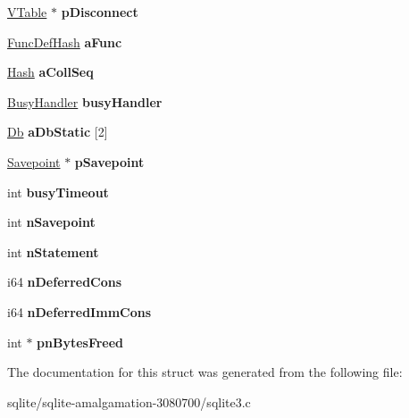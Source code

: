 \begin{DoxyCompactItemize}
\item 
\hypertarget{structsqlite3_a048405f503316fad7d7116fd930299db}{\hyperlink{struct_v_table}{V\+Table} $\ast$ {\bfseries p\+Disconnect}}\label{structsqlite3_a048405f503316fad7d7116fd930299db}

\item 
\hypertarget{structsqlite3_a1f1c623a26e916021fbb2fe6d84dcede}{\hyperlink{struct_func_def_hash}{Func\+Def\+Hash} {\bfseries a\+Func}}\label{structsqlite3_a1f1c623a26e916021fbb2fe6d84dcede}

\item 
\hypertarget{structsqlite3_a259afda236b21b947f6dc7e0b3e605c3}{\hyperlink{struct_hash}{Hash} {\bfseries a\+Coll\+Seq}}\label{structsqlite3_a259afda236b21b947f6dc7e0b3e605c3}

\item 
\hypertarget{structsqlite3_a5f50915803efe2ad40dc1a5e31763671}{\hyperlink{struct_busy_handler}{Busy\+Handler} {\bfseries busy\+Handler}}\label{structsqlite3_a5f50915803efe2ad40dc1a5e31763671}

\item 
\hypertarget{structsqlite3_ad99069213dff7fede71447b97d22d710}{\hyperlink{struct_db}{Db} {\bfseries a\+Db\+Static} \mbox{[}2\mbox{]}}\label{structsqlite3_ad99069213dff7fede71447b97d22d710}

\item 
\hypertarget{structsqlite3_a47f4fe21bba981ccd47ee7f873f48a07}{\hyperlink{struct_savepoint}{Savepoint} $\ast$ {\bfseries p\+Savepoint}}\label{structsqlite3_a47f4fe21bba981ccd47ee7f873f48a07}

\item 
\hypertarget{structsqlite3_a69237f7a2b079706c544f09255fd8905}{int {\bfseries busy\+Timeout}}\label{structsqlite3_a69237f7a2b079706c544f09255fd8905}

\item 
\hypertarget{structsqlite3_a51d1dc4f5668dbc2282162bdfdca96ec}{int {\bfseries n\+Savepoint}}\label{structsqlite3_a51d1dc4f5668dbc2282162bdfdca96ec}

\item 
\hypertarget{structsqlite3_a727c6da42aa4313c715de350303c90f6}{int {\bfseries n\+Statement}}\label{structsqlite3_a727c6da42aa4313c715de350303c90f6}

\item 
\hypertarget{structsqlite3_a1d74627daa6fe93811e99cffe9362c10}{i64 {\bfseries n\+Deferred\+Cons}}\label{structsqlite3_a1d74627daa6fe93811e99cffe9362c10}

\item 
\hypertarget{structsqlite3_a784716abd1e79a084257ad5c6da7ebb5}{i64 {\bfseries n\+Deferred\+Imm\+Cons}}\label{structsqlite3_a784716abd1e79a084257ad5c6da7ebb5}

\item 
\hypertarget{structsqlite3_a5559fb199b06ee59b635bb18f153fcf8}{int $\ast$ {\bfseries pn\+Bytes\+Freed}}\label{structsqlite3_a5559fb199b06ee59b635bb18f153fcf8}

\end{DoxyCompactItemize}


The documentation for this struct was generated from the following file\+:\begin{DoxyCompactItemize}
\item 
sqlite/sqlite-\/amalgamation-\/3080700/sqlite3.\+c\end{DoxyCompactItemize}
